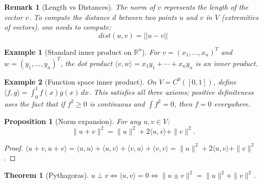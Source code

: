 \documentclass{article}
\newtheorem{theorem}{Theorem}
\newtheorem*{example}{Example}
\newtheorem{remark}{Remark}
\newtheorem{proposition}{Proposition}
\begin{document}
\begin{remark}[Length vs Distances]
    The norm of $v$ represents the length of the vector $v$. To compute the distance $d$ between two points $u$ and $v$ in $V$ (extremities of vectors), one needs to compute:
    \[dist(u,v) = ||u-v||\]
\end{remark}
\begin{example}[Standard inner product on $\mathbb{R}^n$]
    For $v=(x_1,\ldots,x_n)^T$ and $w=(y_1,\ldots,y_n)^T$, the dot product $\langle v,w\rangle = x_1y_1+\cdots+x_ny_n$ is an inner product.
\end{example}
\begin{example}[Function space inner product]
    On $V = C^0([0,1])$, define $\langle f,g\rangle = \int_0^1 f(x)g(x)\,dx$. This satisfies all three axioms; positive definiteness uses the fact that if $f^2 \geq 0$ is continuous and $\int f^2 = 0$, then $f=0$ everywhere.
\end{example}
\begin{proposition}[Norm expansion]
    For any $u,v\in V$:
    \[\|u+v\|^2 = \|u\|^2 + 2\langle u,v\rangle + \|v\|^2.\]
\end{proposition}
\begin{proof}
    $\langle u+v,u+v\rangle = \langle u,u\rangle + \langle u,v\rangle + \langle v,u\rangle + \langle v,v\rangle = \|u\|^2 + 2\langle u,v\rangle + \|v\|^2$.
\end{proof}
\begin{theorem}[Pythagoras]
    $u \perp v \iff \langle u,v\rangle = 0 \iff \|u\pm v\|^2 = \|u\|^2 + \|v\|^2$.
\end{theorem}
\end{document}
